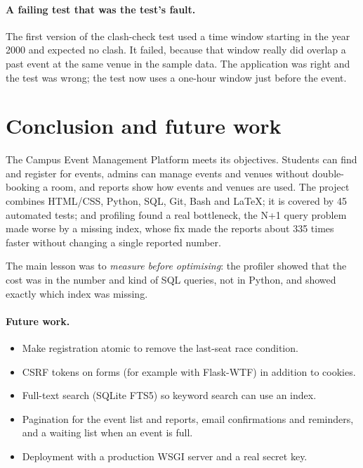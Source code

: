 \documentclass[11pt,a4paper]{article}
\newcommand{\code}[1]{\texttt{\detokenize{#1}}}
\begin{document}
\paragraph{A failing test that was the test's fault.} The first version of the clash-check test
used a time window starting in the year 2000 and expected no clash. It failed, because that window
really did overlap a past event at the same venue in the sample data. The application was right and
the test was wrong; the test now uses a one-hour window just before the event.

\section{Conclusion and future work}

The Campus Event Management Platform meets its objectives. Students can find and register for
events, admins can manage events and venues without double-booking a room, and reports show how
events and venues are used. The project combines HTML/CSS, Python, SQL, Git, Bash and LaTeX; it is
covered by 45 automated tests; and profiling found a real bottleneck, the N+1 query problem made
worse by a missing index, whose fix made the reports about 335 times faster without changing a
single reported number.

The main lesson was to \emph{measure before optimising}: the profiler showed that the cost was in
the number and kind of SQL queries, not in Python, and \code{EXPLAIN QUERY PLAN} showed exactly
which index was missing.

\paragraph{Future work.}
\begin{itemize}[itemsep=2pt]
  \item Make registration atomic to remove the last-seat race condition.
  \item CSRF tokens on forms (for example with Flask-WTF) in addition to \code{SameSite} cookies.
  \item Full-text search (SQLite FTS5) so keyword search can use an index.
  \item Pagination for the event list and reports, email confirmations and reminders, and a
        waiting list when an event is full.
  \item Deployment with a production WSGI server and a real secret key.
\end{itemize}
\end{document}
